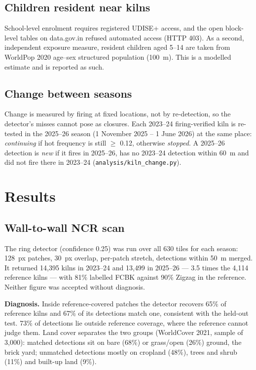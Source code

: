 \documentclass[11pt,a4paper]{article}
\begin{document}
\subsection{Children resident near kilns}
School-level enrolment requires registered UDISE+ access, and the open
block-level tables on data.gov.in refused automated access (HTTP 403). As a
second, independent exposure measure, resident children aged 5--14 are taken
from WorldPop 2020 age--sex structured population (100~m). This is a modelled
estimate and is reported as such.

\subsection{Change between seasons}
Change is measured by firing at fixed locations, not by re-detection, so the
detector's misses cannot pose as closures. Each 2023--24 firing-verified kiln is
re-tested in the 2025--26 season (1 November 2025 -- 1 June 2026) at the same
place: \emph{continuing} if hot frequency is still $\geq$ 0.12, otherwise
\emph{stopped}. A 2025--26 detection is \emph{new} if it fires in 2025--26, has
no 2023--24 detection within 60~m and did not fire there in 2023--24
(\texttt{analysis/kiln\_change.py}).

\section{Results}

\subsection{Wall-to-wall NCR scan}
The ring detector (confidence 0.25) was run over all 630 tiles for each season:
128~px patches, 30~px overlap, per-patch stretch, detections within 50~m merged.
It returned 14{,}395 kilns in 2023--24 and 13{,}499 in 2025--26 --- 3.5 times the
4{,}114 reference kilns --- with 81\% labelled FCBK against 90\% Zigzag in the
reference. Neither figure was accepted without diagnosis.

\textbf{Diagnosis.} Inside reference-covered patches the detector recovers 65\%
of reference kilns and 67\% of its detections match one, consistent with the
held-out test. 73\% of detections lie outside reference coverage, where the
reference cannot judge them. Land cover separates the two groups (WorldCover
2021, sample of 3{,}000): matched detections sit on bare (68\%) or grass/open
(26\%) ground, the brick yard; unmatched detections mostly on cropland (48\%),
trees and shrub (11\%) and built-up land (9\%).
\end{document}
